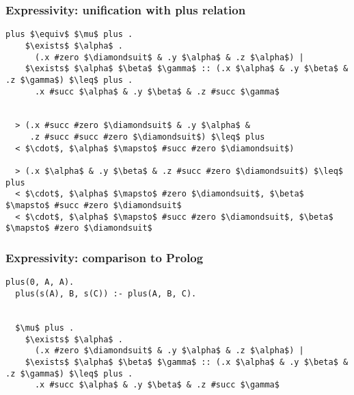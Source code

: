 \documentclass{beamer}
\begin{document}
\begin{frame}[fragile]
  \frametitle{Expressivity: unification with plus relation}

  \begin{lstlisting}[]
  plus $\equiv$ $\mu$ plus .
    $\exists$ $\alpha$ . 
      (.x #zero $\diamondsuit$ & .y $\alpha$ & .z $\alpha$) |
    $\exists$ $\alpha$ $\beta$ $\gamma$ :: (.x $\alpha$ & .y $\beta$ & .z $\gamma$) $\leq$ plus . 
      .x #succ $\alpha$ & .y $\beta$ & .z #succ $\gamma$


  > (.x #succ #zero $\diamondsuit$ & .y $\alpha$ &
     .z #succ #succ #zero $\diamondsuit$) $\leq$ plus
  < $\cdot$, $\alpha$ $\mapsto$ #succ #zero $\diamondsuit$)

  > (.x $\alpha$ & .y $\beta$ & .z #succ #zero $\diamondsuit$) $\leq$ plus
  < $\cdot$, $\alpha$ $\mapsto$ #zero $\diamondsuit$, $\beta$ $\mapsto$ #succ #zero $\diamondsuit$
  < $\cdot$, $\alpha$ $\mapsto$ #succ #zero $\diamondsuit$, $\beta$ $\mapsto$ #zero $\diamondsuit$
  \end{lstlisting}


\end{frame}
\begin{frame}[fragile]
  \frametitle{Expressivity: comparison to Prolog}

  \begin{lstlisting}[]
  plus(0, A, A).
  plus(s(A), B, s(C)) :- plus(A, B, C).


  $\mu$ plus .
    $\exists$ $\alpha$ . 
      (.x #zero $\diamondsuit$ & .y $\alpha$ & .z $\alpha$) |
    $\exists$ $\alpha$ $\beta$ $\gamma$ :: (.x $\alpha$ & .y $\beta$ & .z $\gamma$) $\leq$ plus . 
      .x #succ $\alpha$ & .y $\beta$ & .z #succ $\gamma$
  \end{lstlisting}

\end{frame}
\end{document}
